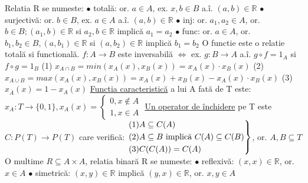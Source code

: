\documentclass[8pt,twocolumn]{extarticle}
\begin{document}
	\noindent Relatia R se numeste: \newline
	$\bullet$ totală: or. $a \in A$, ex. $x, b \in B$ a.î. $(a, b) \in \mathbb{R}$ \newline
	$\bullet$ surjectivă: or. $b \in B$, ex. $a \in A$ a.î. $(a, b) \in \mathbb{R}$ \newline
	$\bullet$ inj: or. $a_{1}, a_{2} \in A$, or. $b \in B; (a_{1}, b) \in \mathbb{R}$ si ${a_{2}, b} \in \mathbb{R}$ implică $a_{1} = a_{2}$ \newline
	$\bullet$ func: or. $a \in A$, or. $b_{1}, b_{2} \in B, (a, b_{1}) \in \mathbb{R}$ si $(a, b_{2}) \in \mathbb{R}$ implică $b_{1} = b_{2}$ \newline
	O functie este o relatie totală si functională. \newline
	$f: A \rightarrow B$ este inversabilă $\Leftrightarrow$ ex. $g: B \rightarrow A$ a.î. $g \circ f = 1_{A}$ si $f \circ g = 1_{B}$ \newline
	(1) $x_{A \cap B} = min(x_{A}(x), x_{B}(x)) = x_{A}(x) \cdot x_{B}(x)$ \newline
	(2) $x_{A \cup B} = max(x_{A}(x), x_{B}(x)) = x_{A}(x) + x_{B}(x) - x_{A}(x) \cdot x_{B}(x)$ \newline
	(3) $x_{\overline{A}}(x) = 1 - x_{A}(x)$ \newline
	\underline{Functia caracteristică} a lui A fată de T este: \newline
	$x_{A}: T \rightarrow \{ 0, 1 \}, x_{A}(x) =
	\begin{cases}
		0, x \notin A\\
		1, x \in A
	\end{cases}$ \newline
	\underline{Un operator de închidere} pe T este $C: P(T) \rightarrow P(T)$ care verifică: \newline
	$\begin{rcases*}
		(1) A \subseteq C(A) \\
		(2) A \subseteq B\text{ implică }C(A) \subseteq C(B) \\
		(3) C(C(A)) = C(A)
	\end{rcases*}$, or. $A, B \subseteq T$ \newline
	O multime $R \subseteq A \times A$, relatia binară R se numeste: \newline
	$\bullet$ reflexivă: $(x, x) \in \mathbb{R}$, or. $x \in A$ \newline
	$\bullet$ simetrică: $(x, y) \in \mathbb{R}$ implică $(y, x) \in \mathbb{R}$, or. $x, y \in A$ \newline
\end{document}
